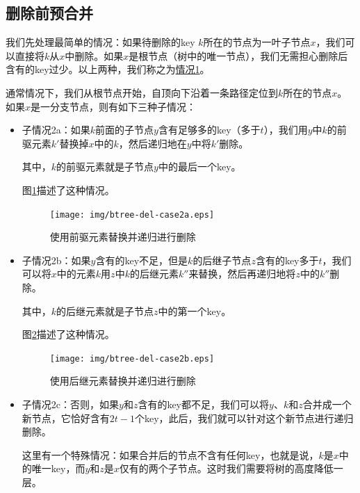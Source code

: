 \documentclass{ctexart}
\begin{document}
\subsection{删除前预合并}

我们先处理最简单的情况：如果待删除的key $k$所在的节点为一叶子节点$x$，我们可以直接将$k$从$x$中删除。如果$x$是根节点（树中的唯一节点），我们无需担心删除后含有的key过少。以上两种，我们称之为\underline{情况1}。

通常情况下，我们从根节点开始，自顶向下沿着一条路径定位到$k$所在的节点$x$。如果$x$是一分支节点，则有如下三种子情况：

\begin{itemize}
\item 子情况2a：如果$k$前面的子节点$y$含有足够多的key（多于$t$），我们用$y$中$k$的前驱元素$k'$替换掉$x$中的$k$，然后递归地在$y$中将$k'$删除。

其中，$k$的前驱元素就是子节点$y$中的最后一个key。

图\ref{fig:btree-del-case2a}描述了这种情况。

\begin{figure}[htbp]
  \centering
    \texttt{[image: img/btree-del-case2a.eps]}
    \caption{使用前驱元素替换并递归进行删除} \label{fig:btree-del-case2a}
\end{figure}

\item 子情况2b：如果$y$含有的key不足，但是$k$的后继子节点$z$含有的key多于$t$，我们可以将$x$中的元素$k$用$z$中$k$的后继元素$k''$来替换，然后再递归地将$z$中的$k''$删除。

其中，$k$的后继元素就是子节点$z$中的第一个key。

图\ref{fig:btree-del-case2b}描述了这种情况。

\begin{figure}[htbp]
  \centering
    \texttt{[image: img/btree-del-case2b.eps]}
    \caption{使用后继元素替换并递归进行删除} \label{fig:btree-del-case2b}
\end{figure}

\item 子情况2c：否则，如果$y$和$z$含有的key都不足，我们可以将$y$、$k$和$z$合并成一个新节点，它恰好含有$2t-1$个key，此后，我们就可以针对这个新节点进行递归删除。

这里有一个特殊情况：如果合并后的节点不含有任何key，也就是说，$k$是$x$中的唯一key，而$y$和$z$是$x$仅有的两个子节点。这时我们需要将树的高度降低一层。
\end{itemize}
\end{document}
